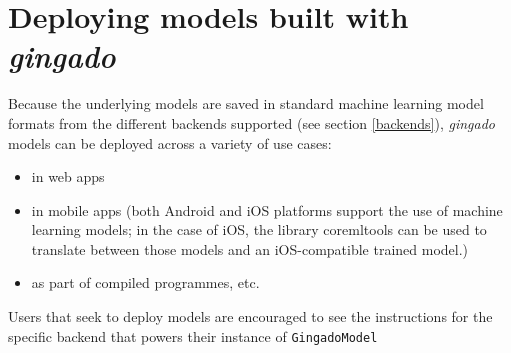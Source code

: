 \documentclass{article}
\begin{document}
\section{Deploying models built with \textit{gingado}}

Because the underlying models are saved in standard machine learning model formats from the different backends supported (see section \ref{backends}), \textit{gingado} models can be deployed across a variety of use cases:
\begin{itemize}
    \item in web apps
    \item in mobile apps (both Android and iOS platforms support the use of machine learning models; in the case of iOS, the library coremltools can be used to translate between those models and an iOS-compatible trained model.)
    \item as part of compiled programmes, etc.
\end{itemize}

Users that seek to deploy models are encouraged to see the instructions for the specific backend that powers their instance of \texttt{GingadoModel}

%
%
\printbibliography
\end{document}
